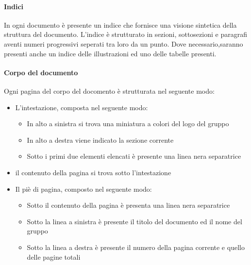 \paragraph{Indici}

In ogni documento è presente un indice che fornisce una visione sintetica della struttura del documento. L'indice è strutturato in sezioni, sottosezioni e paragrafi aventi numeri progressivi seperati tra loro da un punto.\newline
Dove necessario,saranno presenti anche un indice delle illustrazioni ed uno delle tabelle presenti.

\paragraph{Corpo del documento}

Ogni pagina del corpo del docomento è strutturata nel seguente modo:

\begin{itemize}

	\item L'intestazione, composta nel seguente modo:
	
	\begin{itemize}

		\item In alto a sinistra si trova una miniatura a colori del logo del gruppo
	
		\item In alto a destra viene indicato la sezione corrente
	
		\item Sotto i primi due elementi elencati è presente una 	linea nera separatrice

	\end{itemize}
		
	\item il contenuto della pagina si trova sotto l'intestazione
	
	\item Il piè di pagina, composto nel seguente modo:
	
	\begin{itemize}
	
		\item Sotto il contenuto della pagina è presenta una linea nera separatrice
	
		\item Sotto la linea a sinistra è presente il titolo del documento ed il nome del gruppo
		
		\item Sotto la linea a destra è presente il numero della pagina corrente e quello delle pagine totali
		
	\end{itemize}

\end{itemize}

